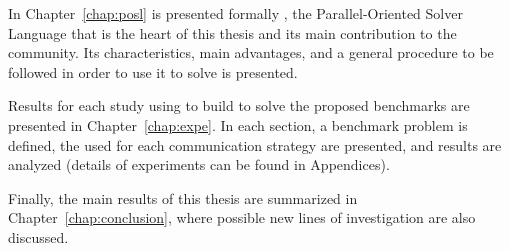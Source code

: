 In Chapter~\ref{chap:posl} is presented formally \posl, the Parallel-Oriented Solver Language that is the heart of this thesis and its main contribution to the community. Its characteristics, main advantages, and a general procedure to be followed in order to use it to solve \CSPs{} is
presented.

Results for each study using \posl{} to build \comstrs{} to solve the proposed benchmarks are presented in Chapter~\ref{chap:expe}. In each section, a benchmark problem is defined, the used \soset{} for each communication strategy are presented, and results are analyzed (details of experiments can be found in Appendices). 

Finally, the main results of this thesis are summarized in Chapter~\ref{chap:conclusion}, where possible new lines of investigation are also discussed.